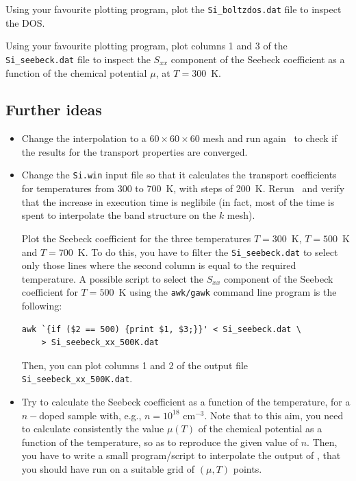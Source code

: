 \documentclass[a4paper,11pt,twoside]{article}
\begin{document}
Using your favourite plotting program, plot the {\tt Si\_boltzdos.dat} file to inspect the DOS.

Using your favourite plotting program, plot columns 1 and 3 of the {\tt Si\_seebeck.dat} file to inspect the $S_{xx}$ component of the Seebeck coefficient as a function of the chemical potential $\mu$, at $T=300$~K.

\subsection*{Further ideas}

\begin{itemize}
\item Change the interpolation to a $60\times 60\times 60$ mesh and run again \postw\ to check if the results for the transport properties are converged. 

\item Change the {\tt Si.win} input file so that it calculates the transport coefficients for temperatures from 300 to 700~K, with steps of 200~K. Rerun \postw\ and verify that the increase in execution time is neglibile (in fact, most of the time is spent to interpolate the band structure on the $k$ mesh).

Plot the Seebeck coefficient for the three temperatures $T=300$~K, $T=500$~K and $T=700$~K. To do this, you have to filter the {\tt Si\_seebeck.dat} to select only those lines where the second column is equal to the required temperature. A possible script to select the $S_{xx}$ component of the Seebeck coefficient for $T=500$~K using the {\tt awk/gawk} command line program is the following:
\begin{verbatim}
awk `{if ($2 == 500) {print $1, $3;}}' < Si_seebeck.dat \
    > Si_seebeck_xx_500K.dat
\end{verbatim}
Then, you can plot columns 1 and 2 of the output file \verb#Si_seebeck_xx_500K.dat#.
\item Try to calculate the Seebeck coefficient as a function of the temperature, for a $n-$doped sample with, e.g., $n=10^{18}$ cm$^{-3}$. Note that to this aim, you need to calculate consistently the value $\mu(T)$ of the chemical potential as a function of the temperature, so as to reproduce the given value of $n$. Then, you have to write a small program/script to interpolate the output of \bw, that you should have run on a suitable grid of $(\mu,T)$ points.
\end{itemize}

\end{document}
